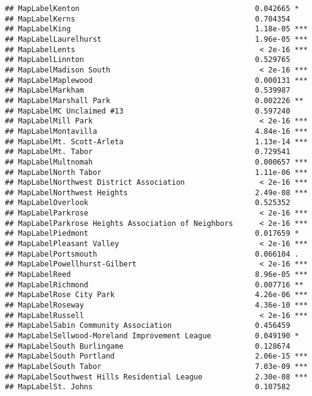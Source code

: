 \documentclass[]{article}
\begin{document}
\begin{verbatim}
## MapLabelKenton                                        0.042665 *  
## MapLabelKerns                                         0.704354    
## MapLabelKing                                          1.18e-05 ***
## MapLabelLaurelhurst                                   1.96e-05 ***
## MapLabelLents                                          < 2e-16 ***
## MapLabelLinnton                                       0.529765    
## MapLabelMadison South                                  < 2e-16 ***
## MapLabelMaplewood                                     0.000131 ***
## MapLabelMarkham                                       0.539987    
## MapLabelMarshall Park                                 0.002226 ** 
## MapLabelMC Unclaimed #13                              0.597240    
## MapLabelMill Park                                      < 2e-16 ***
## MapLabelMontavilla                                    4.84e-16 ***
## MapLabelMt. Scott-Arleta                              1.13e-14 ***
## MapLabelMt. Tabor                                     0.729541    
## MapLabelMultnomah                                     0.000657 ***
## MapLabelNorth Tabor                                   1.11e-06 ***
## MapLabelNorthwest District Association                 < 2e-16 ***
## MapLabelNorthwest Heights                             2.49e-08 ***
## MapLabelOverlook                                      0.525352    
## MapLabelParkrose                                       < 2e-16 ***
## MapLabelParkrose Heights Association of Neighbors      < 2e-16 ***
## MapLabelPiedmont                                      0.017659 *  
## MapLabelPleasant Valley                                < 2e-16 ***
## MapLabelPortsmouth                                    0.066104 .  
## MapLabelPowellhurst-Gilbert                            < 2e-16 ***
## MapLabelReed                                          8.96e-05 ***
## MapLabelRichmond                                      0.007716 ** 
## MapLabelRose City Park                                4.26e-06 ***
## MapLabelRoseway                                       4.36e-10 ***
## MapLabelRussell                                        < 2e-16 ***
## MapLabelSabin Community Association                   0.456459    
## MapLabelSellwood-Moreland Improvement League          0.049190 *  
## MapLabelSouth Burlingame                              0.128674    
## MapLabelSouth Portland                                2.06e-15 ***
## MapLabelSouth Tabor                                   7.03e-09 ***
## MapLabelSouthwest Hills Residential League            2.30e-08 ***
## MapLabelSt. Johns                                     0.107582    

\end{verbatim}
\end{document}
